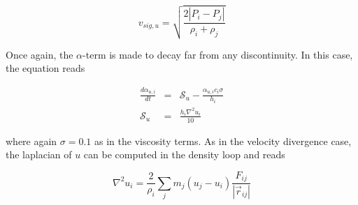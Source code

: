 \documentclass[a4paper,10pt]{article}
\begin{document}
\begin{equation}
 v_{sig,u} = \sqrt{\frac{2|P_i-P_j|}{\rho_i+\rho_j}}
\end{equation}

Once again, the $\alpha$-term is made to decay far from any discontinuity. In this case, the equation reads

\begin{eqnarray}
 \frac{d\alpha_{u,i}}{dt} &=&  \mathcal{S}_u - \frac{\alpha_{u,i}c_i\sigma}{h_i}  \\
 \mathcal{S}_u &=& \frac{h_i \nabla^2 u_i}{10}
\end{eqnarray}

where again $\sigma=0.1$ as in the viscosity terms. As in the velocity divergence case, the laplacian of $u$ can be
computed in the density loop and reads

\begin{equation}
 \nabla^2 u_i = \frac{2}{\rho_i} \sum_j m_j \left(u_j - u_i\right) \frac{F_{ij}}{|\vec{r}_{ij}|}
\end{equation}
\end{document}
